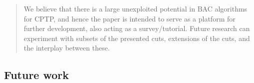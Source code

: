 \begin{quote}
	\cite{jepsen2014}
	We believe that there is a large unexploited potential in BAC algorithms for CPTP, and hence the paper is intended to
	serve as a platform for further development, also acting as a survey/tutorial. Future research can experiment with subsets
	of the presented cuts, extensions of the cuts, and the interplay between these.
\end{quote}

\begin{comment}
\textcite{sadykov2019modern}
Moder nMIP solvers implementing the branch-and-cut approach have been progressing at a
fast pace for the last 30 years, and now they have found a widespread use around
the globe. The branch-and-cut approach however has its limits. It is not efficient
(i.e. does not scale well) for problems for which all known linear relaxations are not
sufficiently tight, even after adding cutting planes. These are problems with complex
combinatorial structure appearing for example in routing, scheduling, packing
and other similar applications.
A radical way to improve the quality of linear relaxations is to substantially
increase the number of variables. For such formulations however it is not possible
to apply directly the standard branch-and-cut approach as variables should then be
generated dynamically. An extension of branch-and-cut to this case is called branch-
cut-and-price, in which the linear relaxation of the problem is solved by the column
generation approach.
\end{comment}

\subsection{Future work}

